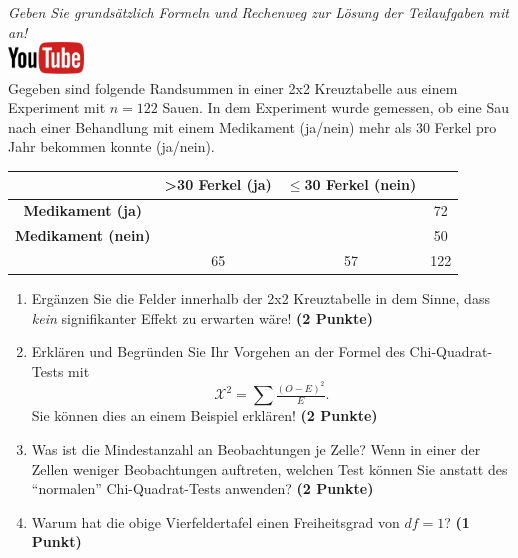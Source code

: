 \documentclass[a4paper, 10pt]{scrartcl}\usepackage[]{graphicx}\usepackage[]{xcolor}
\begin{document}
\textit{Geben Sie grunds{\"a}tzlich Formeln und Rechenweg zur L{\"o}sung der
  Teilaufgaben mit an!} \\[1Ex]

\hfill\href{https://youtu.be/jakM7fHyZfU}{\includegraphics[width =
  2cm]{img/youtube}}\\[1Ex]




Gegeben sind folgende Randsummen in einer 2x2 Kreuztabelle aus einem
Experiment mit $n = 122$ Sauen. In dem Experiment wurde gemessen,
ob eine Sau nach einer Behandlung mit einem Medikament (ja/nein)
mehr als 30 Ferkel pro Jahr bekommen konnte (ja/nein).

\vspace{5Ex}

\begin{center}
  \Large
  \begin{tabular}{c|c|c|c}
     & \textbf{>30 Ferkel (ja)} & \textbf{$\leq$30 Ferkel (nein)} &  \strut\\
    \hline
    \textbf{Medikament (ja)} & \phantom{100}  & \phantom{100}  &   72  \strut\\
    \hline
    \textbf{Medikament (nein)} & \phantom{100}  & \phantom{100}  &   50   \strut\\
    \hline
     &  65 &  57 &  122  \strut\\
  \end{tabular}
\end{center}



\vspace{5Ex}

\begin{enumerate}
\item Erg{\"a}nzen Sie die Felder innerhalb der 2x2 Kreuztabelle in dem Sinne,
  dass \textit{kein} signifikanter Effekt zu erwarten w{\"a}re!
  \textbf{(2 Punkte)}
\item Erkl{\"a}ren und Begr{\"u}nden Sie Ihr Vorgehen an der Formel des
  Chi-Quadrat-Tests mit
  \begin{equation*}
  \mathcal{X}^2 = \sum\tfrac{(O - E)^2}{E}.  
  \end{equation*}
  Sie k{\"o}nnen dies an einem Beispiel erkl{\"a}ren! \textbf{(2 Punkte)}
\item Was ist die Mindestanzahl an Beobachtungen je Zelle? Wenn in einer
  der Zellen weniger Beobachtungen auftreten, welchen Test k{\"o}nnen Sie
  anstatt des "`normalen"' Chi-Quadrat-Tests anwenden? \textbf{(2 Punkte)}
\item Warum hat die obige Vierfeldertafel einen Freiheitsgrad von $df=1$?
  \textbf{(1 Punkt)}
\end{enumerate} 
\clearpage
\end{document}
